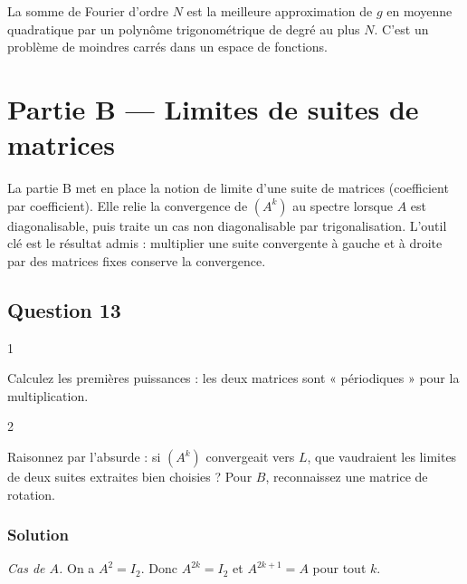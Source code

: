 \documentclass[11pt,a4paper]{article}
\begin{document}
\begin{methode}

La somme de Fourier d'ordre \(N\) est la meilleure approximation de \(g\) en moyenne quadratique par un polynôme trigonométrique de degré au plus \(N\). C'est un problème de moindres carrés dans un espace de fonctions.

\end{methode}

\hypertarget{partie-b-limites-de-suites-de-matrices}{%
\section{Partie B --- Limites de suites de matrices}\label{partie-b-limites-de-suites-de-matrices}}

La partie B met en place la notion de limite d'une suite de matrices (coefficient par coefficient). Elle relie la convergence de \((A^k)\) au spectre lorsque \(A\) est diagonalisable, puis traite un cas non diagonalisable par trigonalisation. L'outil clé est le résultat admis : multiplier une suite convergente à gauche et à droite par des matrices fixes conserve la convergence.

\hypertarget{question-13}{%
\subsection{Question 13}\label{question-13}}

\begin{indication}{1}

Calculez les premières puissances : les deux matrices sont « périodiques » pour la multiplication.

\end{indication}

\begin{indication}{2}

Raisonnez par l'absurde : si \((A^k)\) convergeait vers \(L\), que vaudraient les limites de deux suites extraites bien choisies ? Pour \(B\), reconnaissez une matrice de rotation.

\end{indication}

\hypertarget{solution-12}{%
\subsubsection{Solution}\label{solution-12}}

\emph{Cas de \(A\).} On a \(A^2=I_2\). Donc \(A^{2k}=I_2\) et \(A^{2k+1}=A\) pour tout \(k\).
\end{document}

